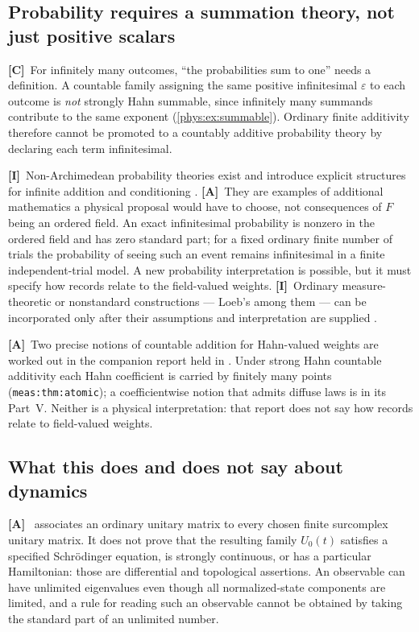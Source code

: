 \documentclass[11pt,letterpaper]{article}
\numberwithin{equation}{section}
\theoremstyle{definition}
\theoremstyle{remark}
\newcommand{\eps}{\varepsilon}
\newcommand{\TC}{\textcolor{TierC}{\textsf{\bfseries[C]}}}
\newcommand{\TA}{\textcolor{TierA}{\textsf{\bfseries[A]}}}
\newcommand{\TI}{\textcolor{TierI}{\textsf{\bfseries[I]}}}
\begin{document}
\subsection{Probability requires a summation theory, not just positive scalars}
\label{phys:sub:probability}

\TC\ For infinitely many outcomes, ``the probabilities sum to one'' needs a
definition. A countable family assigning the same positive infinitesimal $\eps$
to each outcome is \emph{not} strongly Hahn summable, since infinitely many
summands contribute to the same exponent (\cref{phys:ex:summable}). Ordinary
finite additivity therefore cannot be promoted to a countably additive
probability theory by declaring each term infinitesimal.

\TI\ Non-Archimedean probability theories exist and introduce explicit
structures for infinite addition and conditioning \cite{phys:BHW}. \TA\ They
are examples of additional mathematics a physical proposal would have to
choose, not consequences of $F$ being an ordered field. An exact infinitesimal
probability is nonzero in the ordered field and has zero standard part; for a
fixed ordinary finite number of trials the probability of seeing such an event
remains infinitesimal in a finite independent-trial model. A new probability
interpretation is possible, but it must specify how records relate to the
field-valued weights. \TI\ Ordinary measure-theoretic or nonstandard
constructions --- Loeb's among them --- can be incorporated only after their
assumptions and interpretation are supplied \cite{phys:Loeb}.

\TA\ Two precise notions of countable addition for Hahn-valued weights are
worked out in the companion report held in
. Under strong Hahn
countable additivity each Hahn coefficient is carried by finitely many points
(\texttt{meas:thm:atomic}); a coefficientwise notion that admits diffuse laws
is in its Part~V. Neither is a physical interpretation: that report does not
say how records relate to field-valued weights.

\subsection{What this does and does not say about dynamics}
\label{phys:sub:dynamics}

\TA\  associates an ordinary unitary matrix to
every chosen finite surcomplex unitary matrix. It does not prove that the
resulting family $U_{0}(t)$ satisfies a specified Schr\"odinger equation, is
strongly continuous, or has a particular Hamiltonian: those are differential
and topological assertions. An observable can have unlimited eigenvalues even
though all normalized-state components are limited, and a rule for reading such
an observable cannot be obtained by taking the standard part of an unlimited
number.
\end{document}
